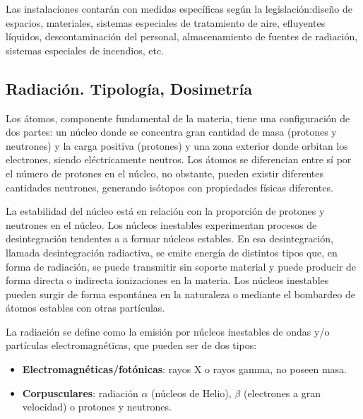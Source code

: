 Las instalaciones contarán con medidas específicas según la legislación:diseño de espacios, materiales, sistemas especiales de tratamiento de aire, efluyentes líquidos, descontaminación del personal, almacenamiento de fuentes de radiación, sistemas especiales de incendios, etc.
\subsection{Radiación. Tipología, Dosimetría}
Los átomos, componente fundamental de la materia, tiene una configuración de dos partes: un núcleo donde se concentra gran cantidad de masa (protones y neutrones) y la carga positiva (protones) y una zona exterior donde orbitan los electrones, siendo eléctricamente neutros. Los átomos se diferencian entre sí por el número de protones en el núcleo, no obstante, pueden existir diferentes cantidades neutrones, generando isótopos con propiedades físicas diferentes.

La estabilidad del núcleo está en relación con la proporción de protones y neutrones en el núcleo. Los núcleos inestables experimentan procesos de desintegración tendentes a a formar núcleos estables. En esa desintegración, llamada desintegración radiactiva, se emite energía de distintos tipos que, en forma de radiación, se puede transmitir sin soporte material y puede producir de forma directa o indirecta ionizaciones en la materia. Los núcleos inestables pueden surgir de forma espontánea en la naturaleza o mediante el bombardeo de átomos estables con otras partículas.

La radiación se define como la emisión por núcleos inestables de ondas y/o partículas electromagnéticas, que pueden ser de dos tipos:
\begin{itemize}
    \item \textbf{Electromagnéticas/fotónicas}: rayos X o rayos gamma, no poseen masa.
    \item \textbf{Corpusculares}: radiación $\alpha$ (núcleos de Helio), $\beta$ (electrones a gran velocidad) o protones y neutrones.
\end{itemize}

